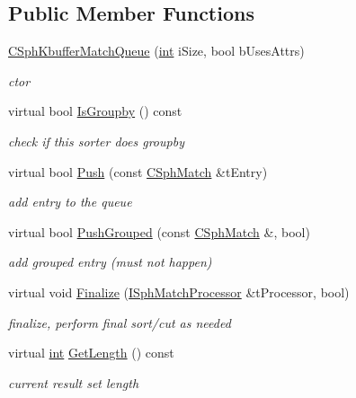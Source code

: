 \subsection*{Public Member Functions}
\begin{DoxyCompactItemize}
\item 
\hyperlink{classCSphKbufferMatchQueue_a52aaefeed65eb4e94afbefe4060ec839}{C\-Sph\-Kbuffer\-Match\-Queue} (\hyperlink{sphinxexpr_8cpp_a4a26e8f9cb8b736e0c4cbf4d16de985e}{int} i\-Size, bool b\-Uses\-Attrs)
\begin{DoxyCompactList}\small\item\em ctor \end{DoxyCompactList}\item 
virtual bool \hyperlink{classCSphKbufferMatchQueue_ab4bac7a3cdc7bba9139a8428a22cd87c}{Is\-Groupby} () const 
\begin{DoxyCompactList}\small\item\em check if this sorter does groupby \end{DoxyCompactList}\item 
virtual bool \hyperlink{classCSphKbufferMatchQueue_a7abe4438fab44e3c83757604878d108f}{Push} (const \hyperlink{classCSphMatch}{C\-Sph\-Match} \&t\-Entry)
\begin{DoxyCompactList}\small\item\em add entry to the queue \end{DoxyCompactList}\item 
virtual bool \hyperlink{classCSphKbufferMatchQueue_a727c58ef7cf036094ff5e88b6dc77f7c}{Push\-Grouped} (const \hyperlink{classCSphMatch}{C\-Sph\-Match} \&, bool)
\begin{DoxyCompactList}\small\item\em add grouped entry (must not happen) \end{DoxyCompactList}\item 
virtual void \hyperlink{classCSphKbufferMatchQueue_aa0f180d9f1567b061a41f691e696f08b}{Finalize} (\hyperlink{structISphMatchProcessor}{I\-Sph\-Match\-Processor} \&t\-Processor, bool)
\begin{DoxyCompactList}\small\item\em finalize, perform final sort/cut as needed \end{DoxyCompactList}\item 
virtual \hyperlink{sphinxexpr_8cpp_a4a26e8f9cb8b736e0c4cbf4d16de985e}{int} \hyperlink{classCSphKbufferMatchQueue_a5a05214290ef8e1d835cff0dbfcd6ddc}{Get\-Length} () const 
\begin{DoxyCompactList}\small\item\em current result set length \end{DoxyCompactList}\item 

\end{DoxyCompactItemize}
